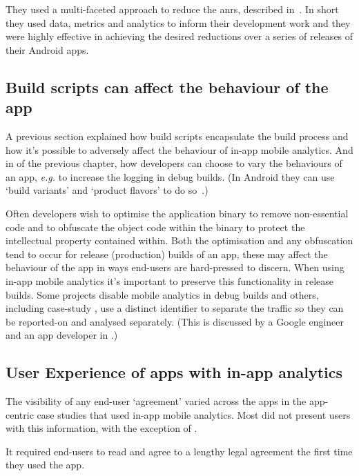 They used a multi-faceted approach to reduce the \Glspl{anr}, described in~. In short they used data, metrics and analytics to inform their development work and they were highly effective in achieving the desired reductions over a series of releases of their Android apps.

\subsection{Build scripts can affect the behaviour of the app}
A previous section  explained how build scripts encapsulate the build process and how it's possible to adversely affect the behaviour of in-app mobile analytics. And in  of the previous chapter, how developers can choose to vary the behaviours of an app, \emph{e.g.} to increase the logging in debug builds. (In Android they can use `build variants' and `product flavors' to do so~.)

Often developers wish to optimise the application binary to remove non-essential code and to obfuscate the object code within the binary to protect the intellectual property contained within. Both the optimisation and any obfuscation tend to occur for release (production) builds of an app, these may affect the behaviour of the app in ways end-users are hard-pressed to discern. When using in-app mobile analytics it's important to preserve this functionality in release builds. Some projects disable mobile analytics in debug builds and others, including case-study , use a distinct identifier to separate the traffic so they can be reported-on and analysed separately. (This is discussed by a Google engineer and an app developer in .)


\subsection{User Experience of apps with in-app analytics}
The visibility of any end-user `agreement' varied across the apps in the app-centric case studies that used in-app mobile analytics. Most did not present users with this information, with the exception of .

It required end-users to read and agree to a lengthy legal agreement the first time they used the app. 

